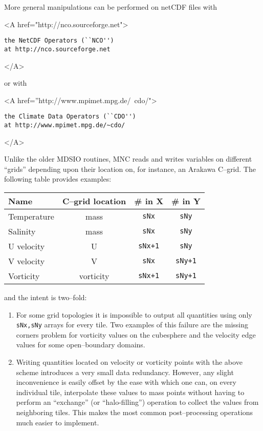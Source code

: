More general manipulations can be performed on netCDF files with 
\begin{rawhtml} <A href="http://nco.sourceforge.net"> \end{rawhtml} 
\begin{verbatim}
the NetCDF Operators (``NCO'')
at http://nco.sourceforge.net
\end{verbatim}
\begin{rawhtml} </A> \end{rawhtml}
or with
\begin{rawhtml} <A href=''http://www.mpimet.mpg.de/~cdo/"> \end{rawhtml} 
\begin{verbatim}
the Climate Data Operators (``CDO'') 
at http://www.mpimet.mpg.de/~cdo/
\end{verbatim}
\begin{rawhtml} </A> \end{rawhtml}

Unlike the older MDSIO routines, MNC reads and writes variables on
different ``grids'' depending upon their location on, for instance, an
Arakawa C--grid.  The following table provides examples:
\begin{center}
  {\footnotesize
    \begin{tabular}[htb]{|l|c|c|c|}\hline
      \textbf{Name}  &  \textbf{C--grid location}  &  
      \textbf{\# in X}  &  \textbf{\# in Y}  \\\hline
      Temperature & mass & \texttt{sNx} & \texttt{sNy} \\
      Salinity & mass & \texttt{sNx} & \texttt{sNy} \\
      U velocity & U & \texttt{sNx+1} & \texttt{sNy} \\
      V velocity & V & \texttt{sNx} & \texttt{sNy+1} \\
      Vorticity & vorticity & \texttt{sNx+1} & \texttt{sNy+1} \\\hline
    \end{tabular}
  }
\end{center}
and the intent is two--fold:
\begin{enumerate}
\item For some grid topologies it is impossible to output all
  quantities using only \texttt{sNx,sNy} arrays for every tile.  Two
  examples of this failure are the missing corners problem for
  vorticity values on the cubesphere and the velocity edge values for
  some open--boundary domains.
\item Writing quantities located on velocity or vorticity points with
  the above scheme introduces a very small data redundancy.  However,
  any slight inconvenience is easily offset by the ease with which one
  can, on every individual tile, interpolate these values to mass
  points without having to perform an ``exchange'' (or
  ``halo-filling'') operation to collect the values from neighboring
  tiles.  This makes the most common post--processing operations much
  easier to implement.
\end{enumerate}


